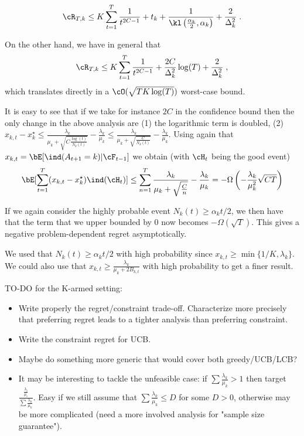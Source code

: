 \[\cR_{T,k}\leq K \sum_{t=1}^T \frac{1}{t^{2C-1}} + t_k + \frac{1}{\kl\left(\frac{\alpha_k}{2}, \alpha_k\right)} + \frac{2}{\Delta_k^2} \;.\]

On the other hand, we have in general that
\[\cR_{T,k}\leq K \sum_{t=1}^T \frac{1}{t^{2C-1}} + \frac{2C}{\Delta_k^2} \log(T) + \frac{2}{\Delta_k^2} \;,  \]
which translates directly in a $\cO(\sqrt{TK\log(T)})$ worst-case bound.

\begin{remark} 
	
It is easy to see that if we take for instance $2C$ in the confidence bound then the only change in the above analysis are (1) the logarithmic term is doubled, (2) $x_{k, t}-x_k^\star\leq \frac{\lambda_k}{\mu_k+\sqrt{C\frac{\log(t)}{N_k(t)}}}-\frac{\lambda_k}{\mu_k}\leq \frac{\lambda_k}{\mu_k+\sqrt{\frac{C}{N_k(t)}}}-\frac{\lambda_k}{\mu_k}$. Using again that $x_{k,t}=\bE[\ind(A_{t+1}=k)|\cF_{t-1}]$ we obtain (with $\cH_t$ being the good event)
\[\bE[\sum_{t=1}^T(x_{k,t}-x_k^\star)\ind(\cH_t)] \leq \sum_{n=1}^T \frac{\lambda_k}{\mu_k+\sqrt{\frac{C}{n}}}-\frac{\lambda_k}{\mu_k} = -\Omega\left(-\frac{\lambda_k}{\mu_k^2}\sqrt{CT}\right)
\]

If we again consider the highly probable event $N_k(t)\geq \alpha_k t/2$, we then have that the term that we upper bounded by $0$ now becomes $-\Omega(\sqrt{T})$. This gives a negative problem-dependent regret asymptotically.
\end{remark}


\begin{remark} 
	We used that $N_k(t)\geq \alpha_k t/2$ with high probability since $x_{k, t}\geq \min\{1/K, \lambda_k \}$. We could also use that $x_{k, t}\geq \frac{\lambda_k}{\mu_k+ 2 B_{k, t}}$ with high probability to get a finer result.
\end{remark}

TO-DO for the K-armed setting:
\begin{itemize}
	\item Write properly the regret/constraint trade-off. Characterize more precisely that preferring regret leads to a tighter analysis than preferring constraint.
	\item Write the constraint regret for UCB.
	\item Maybe do something more generic that would cover both greedy/UCB/LCB?
	\item It may be interesting to tackle the unfeasible case: if $\sum \frac{\lambda_k}{\mu_k}>1$ then target $\frac{\frac{\lambda_i}{\mu_i}}{\sum \frac{\lambda_k}{\mu_k}}$. Easy if we still assume that $\sum \frac{\lambda_k}{\mu_k}\leq D$ for some $D>0$, otherwise may be more complicated (need a more involved analysis for "sample size guarantee").
\end{itemize}